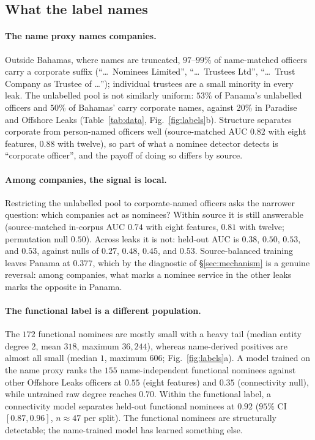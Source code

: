 \documentclass[11pt]{article}
\begin{document}
\subsection{What the label names}\label{sec:res-label}
\paragraph{The name proxy names companies.} Outside Bahamas, where names are
truncated, $97$--$99\%$ of name-matched officers carry a corporate suffix
(``\ldots\ Nominees Limited'', ``\ldots\ Trustees Ltd'', ``\ldots\ Trust Company as
Trustee of \ldots''); individual trustees are a small minority in every leak. The
unlabelled pool is not similarly uniform: $53\%$ of Panama's unlabelled officers
and $50\%$ of Bahamas' carry corporate names, against $20\%$ in Paradise and
Offshore Leaks (Table~\ref{tab:data}, Fig.~\ref{fig:labels}b). Structure separates
corporate from person-named officers well (source-matched AUC $0.82$ with eight
features, $0.88$ with twelve), so part of what a nominee detector detects is
``corporate officer'', and the payoff of doing so differs by source.

\paragraph{Among companies, the signal is local.} Restricting the unlabelled pool
to corporate-named officers asks the narrower question: which companies act as
nominees? Within source it is still answerable (source-matched in-corpus AUC
$0.74$ with eight features, $0.81$ with twelve; permutation null $0.50$). Across
leaks it is not: held-out AUC is $0.38$, $0.50$, $0.53$, and $0.53$, against nulls
of $0.27$, $0.48$, $0.45$, and $0.53$. Source-balanced training leaves Panama at
$0.377$, which by the diagnostic of \S\ref{sec:mechanism} is a genuine reversal: among
companies, what marks a nominee service in the other leaks marks the opposite in
Panama.

\paragraph{The functional label is a different population.} The $172$ functional
nominees are mostly small with a heavy tail (median entity degree $2$, mean
$318$, maximum $36{,}244$), whereas name-derived positives are almost all small
(median $1$, maximum $606$; Fig.~\ref{fig:labels}a). A model trained on the name
proxy ranks the $155$ name-independent functional nominees against other Offshore
Leaks officers at $0.55$ (eight features) and $0.35$ (connectivity null), while
untrained raw degree reaches $0.70$. Within the functional label, a connectivity
model separates held-out functional nominees at $0.92$ ($95\%$ CI $[0.87, 0.96]$,
$n\approx47$ per split). The functional nominees are structurally detectable; the
name-trained model has learned something else.
\end{document}
